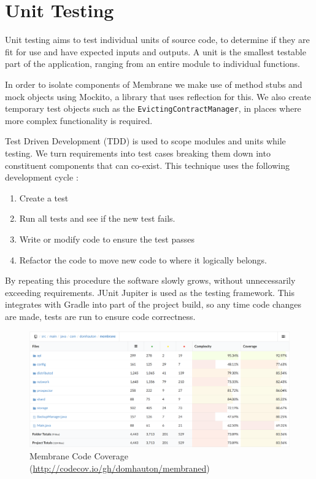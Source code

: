 \documentclass[11pt, a4paper, twoside]{report}
\def\code#1{\texttt{#1}}
\begin{document}
\section{Unit Testing}

Unit testing aims to test individual units of source code, to determine if they are fit for use and have expected inputs and outputs. \citep{huizinga2007automated} A unit is the smallest testable part of the application, ranging from an entire module to individual functions.

In order to isolate components of Membrane we make use of method stubs and mock objects \citep{osherove2015art} using Mockito, a library that uses reflection for this. We also create temporary test objects such as the \code{EvictingContractManager}, in places where more complex functionality is required.

Test Driven Development (TDD) is used to scope modules and units while testing. We turn requirements into test cases breaking them down into constituent components that can co-exist. This technique uses the following development cycle \citep{beck2003test}:

\begin{enumerate}
 \item Create a test
 \item Run all tests and see if the new test fails.
 \item Write or modify code to ensure the test passes
 \item Refactor the code to move new code to where it logically belongs.
\end{enumerate}

By repeating this procedure the software slowly grows, without unnecessarily exceeding requirements. JUnit Jupiter is used as the testing framework. This integrates with Gradle into part of the project build, so any time code changes are made, tests are run to ensure code correctness.

\begin{figure}[!ht]
 \centering
 \includegraphics[width=\textwidth]{code-coverage}
 \caption{Membrane Code Coverage (\url{http://codecov.io/gh/domhauton/membraned})}
 \label{fig:code-coverage}
\end{figure}
\end{document}
